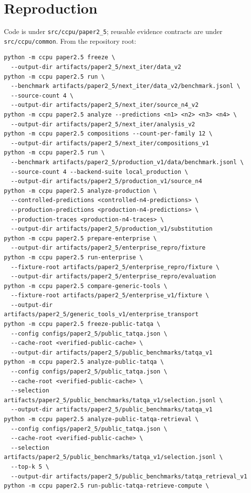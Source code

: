 \documentclass[11pt]{article}
\begin{document}
\section{Reproduction}
Code is under \texttt{src/ccpu/paper2\_5}; reusable evidence contracts are under
\texttt{src/ccpu/common}. From the repository root:
\begin{verbatim}
python -m ccpu paper2.5 freeze \
  --output-dir artifacts/paper2_5/next_iter/data_v2
python -m ccpu paper2.5 run \
  --benchmark artifacts/paper2_5/next_iter/data_v2/benchmark.jsonl \
  --source-count 4 \
  --output-dir artifacts/paper2_5/next_iter/source_n4_v2
python -m ccpu paper2.5 analyze --predictions <n1> <n2> <n3> <n4> \
  --output-dir artifacts/paper2_5/next_iter/analysis_v2
python -m ccpu paper2.5 compositions --count-per-family 12 \
  --output-dir artifacts/paper2_5/next_iter/compositions_v1
python -m ccpu paper2.5 run \
  --benchmark artifacts/paper2_5/production_v1/data/benchmark.jsonl \
  --source-count 4 --backend-suite local_production \
  --output-dir artifacts/paper2_5/production_v1/source_n4
python -m ccpu paper2.5 analyze-production \
  --controlled-predictions <controlled-n4-predictions> \
  --production-predictions <production-n4-predictions> \
  --production-traces <production-n4-traces> \
  --output-dir artifacts/paper2_5/production_v1/substitution
python -m ccpu paper2.5 prepare-enterprise \
  --output-dir artifacts/paper2_5/enterprise_repro/fixture
python -m ccpu paper2.5 run-enterprise \
  --fixture-root artifacts/paper2_5/enterprise_repro/fixture \
  --output-dir artifacts/paper2_5/enterprise_repro/evaluation
python -m ccpu paper2.5 compare-generic-tools \
  --fixture-root artifacts/paper2_5/enterprise_v1/fixture \
  --output-dir artifacts/paper2_5/generic_tools_v1/enterprise_transport
python -m ccpu paper2.5 freeze-public-tatqa \
  --config configs/paper2_5/public_tatqa.json \
  --cache-root <verified-public-cache> \
  --output-dir artifacts/paper2_5/public_benchmarks/tatqa_v1
python -m ccpu paper2.5 analyze-public-tatqa \
  --config configs/paper2_5/public_tatqa.json \
  --cache-root <verified-public-cache> \
  --selection artifacts/paper2_5/public_benchmarks/tatqa_v1/selection.jsonl \
  --output-dir artifacts/paper2_5/public_benchmarks/tatqa_v1
python -m ccpu paper2.5 analyze-public-tatqa-retrieval \
  --config configs/paper2_5/public_tatqa.json \
  --cache-root <verified-public-cache> \
  --selection artifacts/paper2_5/public_benchmarks/tatqa_v1/selection.jsonl \
  --top-k 5 \
  --output-dir artifacts/paper2_5/public_benchmarks/tatqa_retrieval_v1
python -m ccpu paper2.5 run-public-tatqa-retrieve-compute \

\end{verbatim}
\end{document}
